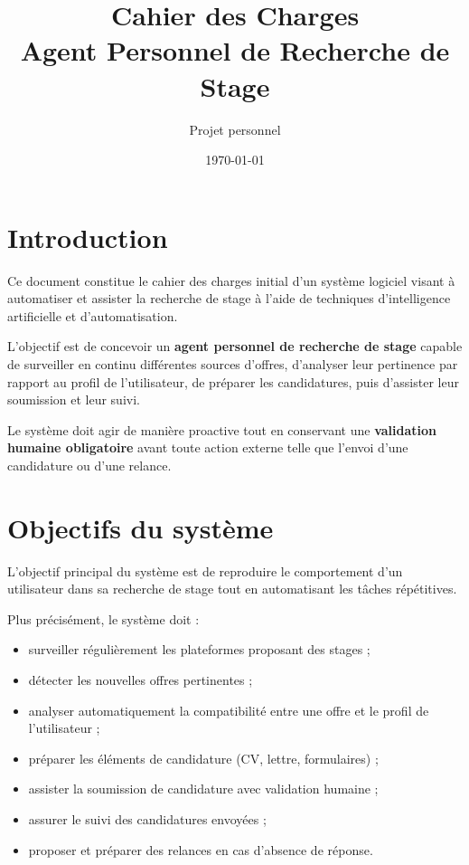 \documentclass[11pt,a4paper]{article}
\title{Cahier des Charges\\
Agent Personnel de Recherche de Stage}
\author{Projet personnel}
\date{\today}
\begin{document}
\maketitle

\tableofcontents

\newpage

\section{Introduction}

Ce document constitue le cahier des charges initial d’un système logiciel visant à automatiser et assister la recherche de stage à l’aide de techniques d’intelligence artificielle et d’automatisation.

L'objectif est de concevoir un \textbf{agent personnel de recherche de stage} capable de surveiller en continu différentes sources d’offres, d’analyser leur pertinence par rapport au profil de l’utilisateur, de préparer les candidatures, puis d’assister leur soumission et leur suivi.

Le système doit agir de manière proactive tout en conservant une \textbf{validation humaine obligatoire} avant toute action externe telle que l’envoi d’une candidature ou d’une relance.

\section{Objectifs du système}

L’objectif principal du système est de reproduire le comportement d’un utilisateur dans sa recherche de stage tout en automatisant les tâches répétitives.

Plus précisément, le système doit :

\begin{itemize}
\item surveiller régulièrement les plateformes proposant des stages ;
\item détecter les nouvelles offres pertinentes ;
\item analyser automatiquement la compatibilité entre une offre et le profil de l’utilisateur ;
\item préparer les éléments de candidature (CV, lettre, formulaires) ;
\item assister la soumission de candidature avec validation humaine ;
\item assurer le suivi des candidatures envoyées ;
\item proposer et préparer des relances en cas d’absence de réponse.
\end{itemize}
\end{document}
